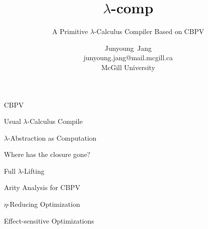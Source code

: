 \documentclass[letterpaper,10pt,aspectratio=169,dvipsnames]{beamer}
\title[\texorpdfstring{\(\lambda\)-comp}{lambdacomp}: A Primitive \texorpdfstring{\(\lambda\)-Calculus}{Lambda Calculus} Compiler Based on CBPV]{\(\lambda\)-comp}
\subtitle{A Primitive \(\lambda\)-Calculus Compiler Based on CBPV}
\author[Junyoung Jang]{\parbox{10em}{\centering Junyoung~Jang\\{}{\scriptsize junyoung.jang@mail.mcgill.ca}\\{}{\scriptsize McGill University}}}
\date{}
\begin{document}
\begin{frame}[plain]
  \titlepage
\end{frame}

\begin{frame}{CBPV}
\end{frame}

\begin{frame}{Usual \(\lambda\)-Calculus Compile}
\end{frame}

\begin{frame}{\(\lambda\)-Abstraction as Computation}
\end{frame}

\begin{frame}{Where has the closure gone?}
\end{frame}

\begin{frame}{Full \(\lambda\)-Lifting}
\end{frame}

\begin{frame}{Arity Analysis for CBPV}
\end{frame}

\begin{frame}{\(\eta\)-Reducing Optimization}
\end{frame}

\begin{frame}{Effect-sensitive Optimizations}
\end{frame}
\end{document}
